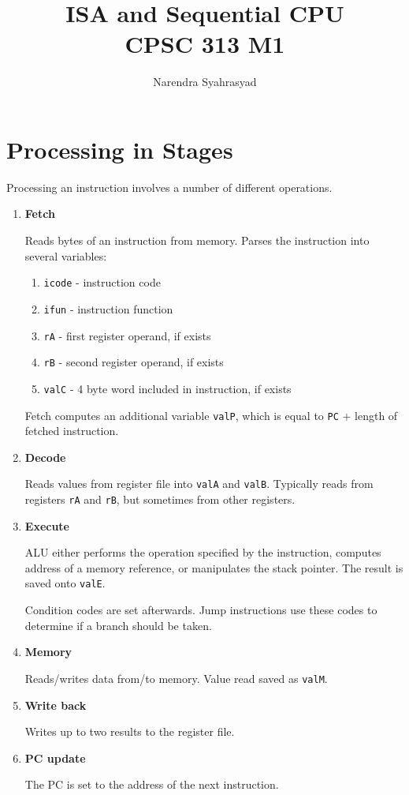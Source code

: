 \documentclass[a4paper]{article}
\author{Narendra Syahrasyad}
\title{ISA and Sequential CPU\\
\vspace{5mm}
\large CPSC 313 M1}
\date{}
\newcommand{\code}[1]{\texttt{#1}}
\begin{document}
\maketitle

\section{Processing in Stages}

Processing an instruction involves a number of different operations.

\begin{enumerate}
    \item \textbf{Fetch}
    
    Reads bytes of an instruction from memory. Parses the instruction into several variables:
    \begin{enumerate}
        \item \code{icode} - instruction code
        \item \code{ifun} - instruction function
        \item \code{rA} - first register operand, if exists
        \item \code{rB} - second register operand, if exists
        \item \code{valC} - 4 byte word included in instruction, if exists
    \end{enumerate}
    Fetch computes an additional variable \code{valP}, which is equal to \code{PC} $+$ length of fetched instruction.
    
    \item \textbf{Decode}
    
    Reads values from register file into \code{valA} and \code{valB}. Typically reads from registers \code{rA} and \code{rB}, but sometimes from other registers.
    
    \item \textbf{Execute}
    
    ALU either performs the operation specified by the instruction, computes address of a memory reference, or manipulates the stack pointer. The result is saved onto \code{valE}.
    
    Condition codes are set afterwards. Jump instructions use these codes to determine if a branch should be taken.
    
    \item \textbf{Memory}
    
    Reads/writes data from/to memory. Value read saved as \code{valM}.
    
    \item \textbf{Write back}
    
    Writes up to two results to the register file.
    
    \item \textbf{PC update}
    
    The PC is set to the address of the next instruction.
\end{enumerate}
\end{document}
